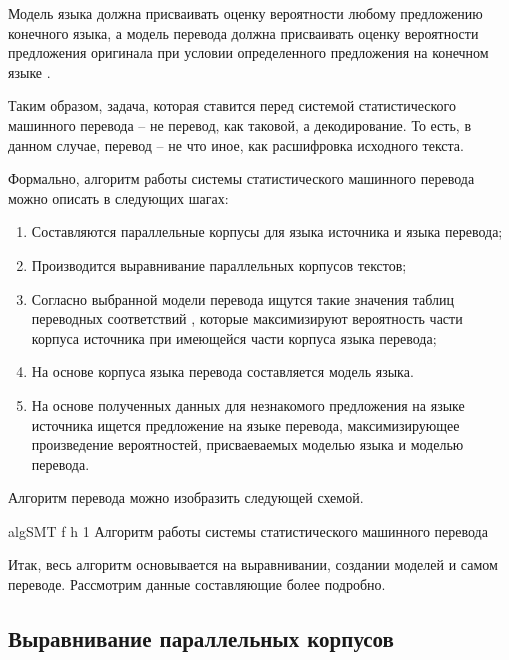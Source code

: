 \clearpage

Модель языка должна присваивать оценку вероятности любому предложению конечного языка, а модель перевода должна присваивать оценку вероятности предложения оригинала при условии определенного предложения на конечном языке \cite{smt}. 

Таким образом, задача, которая ставится перед системой статистического машинного перевода – не перевод, как таковой, а декодирование. То есть, в данном случае, перевод -- не что иное, как расшифровка исходного текста. 

Формально, алгоритм работы системы статистического машинного перевода можно описать в следующих шагах:

\begin{enumerate}
	\item Составляются параллельные корпусы \cite{smt} для языка источника и языка перевода;
	\item Производится выравнивание \cite{smt} параллельных корпусов текстов;
	\item Согласно выбранной модели перевода ищутся такие значения таблиц переводных соответствий \cite{smt_book}, которые максимизируют вероятность части корпуса источника при имеющейся части корпуса языка перевода;
	\item На основе корпуса языка перевода составляется модель языка.
	\item На основе полученных данных для незнакомого предложения на языке источника ищется предложение на языке перевода, максимизирующее произведение вероятностей, присваеваемых моделью языка и моделью перевода.
\end{enumerate}

\clearpage

Алгоритм перевода можно изобразить следующей схемой.

{algSMT} %
{f} %
{h} %
{1\textwidth} %
{Алгоритм работы системы статистического машинного перевода} %

Итак, весь алгоритм основывается на выравнивании, создании моделей
и самом переводе. Рассмотрим данные составляющие более подробно.

\subsection{Выравнивание параллельных корпусов}


